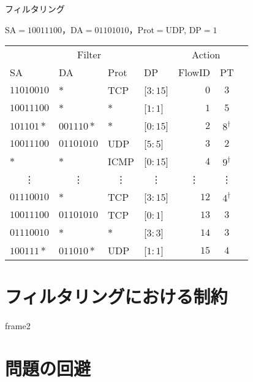 \documentclass[12pt,dvipdfmx,mathserif,uplatex,aspectratio=32]{beamer}
\begin{document}
\begin{frame}{フィルタリング}

{\centering
SA$=10011100$，DA$=01101010$，Prot$=$UDP, DP$=1$

}
\begin{table}
{\centering

 {\small
 \begin{tabular}{|l|l|l|l||r|c|c} \cline{1-6}
 \multicolumn{4}{|c||}{Filter} & \multicolumn{2}{|c|}{Action} & \\ \cline{1-6}
 SA & DA & Prot & DP & FlowID & PT  & \\ \cline{1-6}
 $11010010$ & $*$        & TCP  & [$3:15$] & $0$  & $3$ & \\
 $10011100$ & $*$        & $*$  & [$1:1$]  & $1$  & $5$ & \\
 $101101*$  & $001110*$  & $*$  & [$0:15$] & $2$  & $8^{\dagger}$ & \\
 $10011100$ & $01101010$ & UDP  & [$5:5$]  & $3$  & $2$ & \\
 $*$        & $*$        & ICMP & [$0:15$] & $4$  & $9^{\dagger}$ & \\
 \multicolumn{1}{|c}{\vdots} & \multicolumn{1}{|c}{\vdots} & \multicolumn{1}{|c}{\vdots} & \multicolumn{1}{|c||}{\vdots} & \multicolumn{1}{|c}{\vdots} & \multicolumn{1}{|c|}{\vdots} & \\
 $01110010$ & $*$        & TCP  & [$3:15$] & $12$ & $4^{\dagger}$ & \\
 $10011100$ & $01101010$ & TCP  & [$0:1$]  & $13$ & $3$ & \\
 $01110010$ & $*$        & $*$  & [$3:3$]  & $14$ & $3$ & \\
 $100111*$  & $011010*$  & UDP  & [$1:1$]  & $15$ & $4$ & \color{red}{\LARGE $\Leftarrow$} \\ \cline{1-6}
 \end{tabular}

 }

}
\end{table}

\end{frame}


\section{フィルタリングにおける制約}


\begin{frame}{frame2}

\end{frame}



\section{問題の回避}


\begin{frame}

\end{frame}
\end{document}
